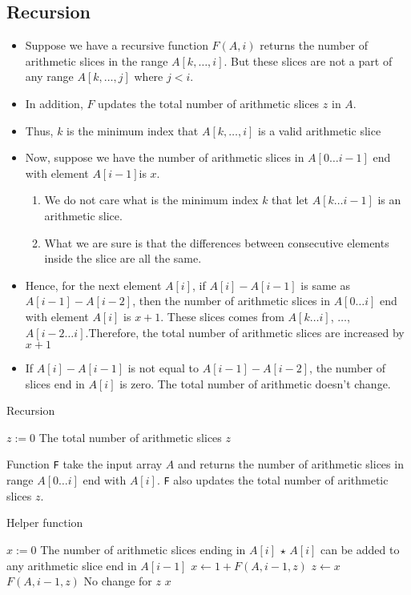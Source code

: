 \subsection{Recursion}
\begin{itemize}
\item Suppose we have a recursive function $F(A,i)$ returns the number of arithmetic slices in the range $A[k,\ldots,i]$. But these slices are not a part of any range $A[k,\ldots, j]$ where $j<i$. 
\item In addition, $F$ updates the total number of arithmetic slices $z$ in $A$.
\item Thus, $k$ is the minimum index that $A[k,\ldots,i]$ is a valid arithmetic slice
\item Now, suppose we have the number of arithmetic slices in $A[0\ldots i-1]$ end with element $A[i-1]$is $x$.
\begin{enumerate}
\item We do not care what is the minimum index $k$ that let $A[k\ldots i-1]$ is an arithmetic slice.
\item What we are sure is that the differences between consecutive elements inside the slice are all the same.
\end{enumerate}
\item Hence, for the next element $A[i]$, if $A[i]-A[i-1]$ is same as $A[i-1]-A[i-2]$, then the number of arithmetic slices in $A[0\ldots i]$ end with element $A[i]$ is $x+1$.
These slices comes from $A[k\ldots i]$, $\ldots$, $A[i-2\ldots i]$.Therefore, the total number of arithmetic slices are increased by $x+1$
\item If $A[i]-A[i-1]$ is not equal to $A[i-1] - A[i-2]$, the number of slices end in $A[i]$ is zero. The total number of arithmetic doesn't change.
\end{itemize}

\setcounter{algorithm}{0}
\begin{algorithm}[H]
\caption{Recursion}
\begin{algorithmic}[1]
\State $z:=0$ \Comment The total number of arithmetic slices
\State {}
\State \Return $z$
\EndProcedure
\end{algorithmic}
\end{algorithm}

Function \texttt{F} take the input array $A$ and returns the number of arithmetic slices in range $A[0\ldots i]$ end with $A[i]$. \texttt{F} also updates the total number of arithmetic slices $z$.
\begin{algorithm}[H]
\caption{Helper function}
\begin{algorithmic}[1]
\State {}
\EndIf
\State $x:=0$ \Comment The number of arithmetic slices ending in $A[i]$
\State $\star$ $A[i]$ can be added to any arithmetic slice end in $A[i-1]$
\State $x\gets 1 + F(A,i-1, z)$
\State $z\gets x$
\Else
\State $F(A, i-1, z)$ \Comment No change for $z$
\EndIf
\State \Return $x$
\EndProcedure
\end{algorithmic}
\end{algorithm}

